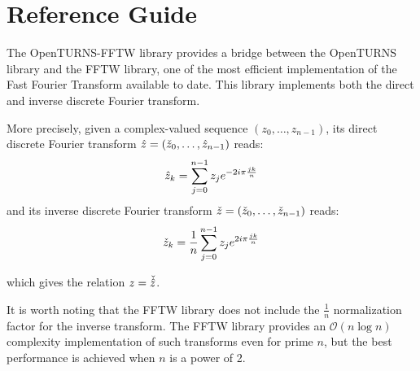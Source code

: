 % 




\section{Reference Guide}

The OpenTURNS-FFTW library provides a bridge between the OpenTURNS library and the FFTW library, one of the most efficient implementation of the Fast Fourier Transform available to date. This library implements both the direct and inverse discrete Fourier transform.

More precisely, given a complex-valued sequence $(z_0,\dots,z_{n-1})$, its direct discrete Fourier transform $\Hat{z}=(\Check{z}_0,\dots,\Hat{z}_{n-1})$ reads:
$$
\Hat{z}_k = \sum_{j=0}^{n-1}z_j e^{-2i\pi\frac{jk}{n}}
$$
and its inverse discrete Fourier transform $\Check{z}=(\Check{z}_0,\dots,\Check{z}_{n-1})$ reads:
$$
\Check{z}_k = \frac{1}{n}\sum_{j=0}^{n-1}z_j e^{2i\pi\frac{jk}{n}}
$$

which gives the relation $z=\Check{\Hat{z}}$.

It is worth noting that the FFTW library does not include the $\frac{1}{n}$ normalization factor for the inverse transform. The FFTW library provides an $\mathcal{O}(n\log n)$ complexity implementation of such transforms even for prime $n$, but the best performance is achieved when $n$ is a power of 2.